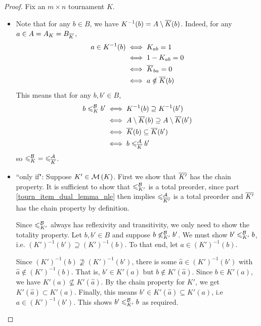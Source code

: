 \begin{proof}
    Fix an $m \times n$ tournament $K$.

    \begin{itemize}
    \item
    Note that for any $b \in B$, we have $K^{-1}(b) = A \setminus {\overline{K}}(b)$.
    Indeed, for any $a \in A = A_K = B_{{\overline{K}}}$,
    \begin{align*}
        a \in K^{-1}(b)
        &\iff K_{ab} = 1 \\
        &\iff 1 - K_{ab} = 0 \\
        &\iff {\overline{K}}_{ba} = 0 \\
        &\iff a \notin {\overline{K}}(b)
    \end{align*}
    This means that for any $b, b' \in B$,
    \begin{align*}
        b \leqslant^{\mathcal{B}}_K b'
        &\iff K^{-1}(b) \supseteq K^{-1}(b') \\
        &\iff A \setminus {\overline{K}}(b) \supseteq A \setminus {\overline{K}}(b') \\
        &\iff {\overline{K}}(b) \subseteq {\overline{K}}(b') \\
        &\iff b \leqslant^{\mathcal{A}}_{{\overline{K}}} b'
    \end{align*}
    so ${\leqslant^{\mathcal{B}}_K} = {\leqslant^{\mathcal{A}}_{{\overline{K}}}}$.

    \item
    ``only if": Suppose $K' \in \operatorname{\mathcal{M}}\left({K}\right)$. First we show that ${\overline{K'}}$ has
    the chain property. It is sufficient to show that ${\leqslant^{\mathcal{B}}_{K'}}$ is a total
    preorder,\footnotemark{} since part \cref{tourn_item_dual_lemma_nle}
    then implies ${\leqslant^{\mathcal{A}}_{{\overline{K'}}}}$ is a total preorder and ${\overline{K'}}$ has
    the chain property by definition.


    Since ${\leqslant^{\mathcal{B}}_{K'}}$ always has reflexivity and transitivity, we only need
    to show the totality property. Let $b, b' \in B$ and suppose $b
    \not\leqslant^{\mathcal{B}}_{K'} b'$. We must show $b' \leqslant^{\mathcal{B}}_{K'} b$, i.e. $(K')^{-1}(b')
    \supseteq (K')^{-1}(b)$. To that end, let $a \in (K')^{-1}(b)$.

    Since $(K')^{-1}(b) \not\supseteq (K')^{-1}(b')$, there is some $\hat{a}
    \in (K')^{-1}(b')$ with $\hat{a} \notin (K')^{-1}(b)$. That is, $b' \in
    K'(\hat{a})$ but $b \notin K'(\hat{a})$. Since $b \in K'(a)$, we have
    $K'(a) \not\subseteq K'(\hat{a})$. By the chain property for $K'$, we get
    $K'(\hat{a}) \subset K'(a)$. Finally, this means $b' \in K'(\hat{a})
    \subseteq K'(a)$, i.e $a \in (K')^{-1}(b')$. This shows $b' \leqslant^{\mathcal{B}}_{K'} b$
    as required.


\end{itemize}
\end{proof}
